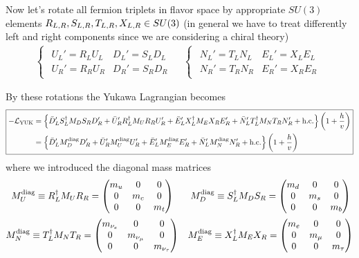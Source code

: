 \documentclass[TheoreticalPhy_ModB.tex]{subfiles}
\begin{document}
Now let's rotate all fermion triplets in flavor space by appropriate $SU(3)$ elements $R_{L,R},S_{L,R},T_{L,R},X_{L,R}\in SU(3)$ (in general we have to treat differently left and right components since we are considering a chiral theory)
\begin{equation}\label{eqn:rotat-flavor-mass}
\begin{matrix}
	\begin{cases}
		\begin{matrix}
			U_L'=R_LU_L & D_L'=S_LD_L\\
			U_R'=R_RU_R & D_R'=S_RD_R
		\end{matrix}
	\end{cases}
	&
	\begin{cases}
		\begin{matrix}
			N_L'=T_LN_L & E_L'=X_LE_L\\
			N_R'=T_RN_R & E_R'=X_RE_R
		\end{matrix}
	\end{cases}
\end{matrix}
\end{equation}
		
By these rotations the Yukawa Lagrangian becomes
\[\boxed{\begin{aligned}
-\mathcal L_{\text{YUK}}&=\left\{\bar D_L'S_L^\dagger M_DS_RD_R'+\bar U_R'R_L^\dagger M_UR_RU_R'+\bar E_L'X_L^\dagger M_EX_RE_R'+\bar N_L'T_L^\dagger M_NT_RN_R'+\text{h.c.}\right\}\left(1+\frac hv\right)\\
&=\left\{\bar D_L'M_D^{\text{diag}}D_R'+\bar U_R'M_U^{\text{diag}}U_R'+\bar E_L'M_E^{\text{diag}}E_R'+\bar N_L'M_N^{\text{diag}}N_R'+\text{h.c.}\right\}\left(1+\frac hv\right)
\end{aligned}}\]
where we introduced the diagonal mass matrices
\[\begin{matrix}
	M_U^{\text{diag}}\equiv R_L^\dagger M_UR_R =
	\begin{pmatrix}m_u&0&0\\0&m_c&0\\0&0&m_t\end{pmatrix}
	&
	M_D^{\text{diag}}\equiv S_L^\dagger M_DS_R =
	\begin{pmatrix}m_d&0&0\\0&m_s&0\\0&0&m_b\end{pmatrix}
	\vspace{0.2cm}\\
	M_N^{\text{diag}}\equiv T_L^\dagger M_NT_R =
	\begin{pmatrix}m_{\nu_e}&0&0\\0&m_{\nu_\mu}&0\\0&0&m_{\nu_\tau}\end{pmatrix}
	&
	M_E^{\text{diag}}\equiv X_L^\dagger M_EX_R =
	\begin{pmatrix}m_e&0&0\\0&m_\mu&0\\0&0&m_\tau\end{pmatrix}
\end{matrix}\]
\end{document}
